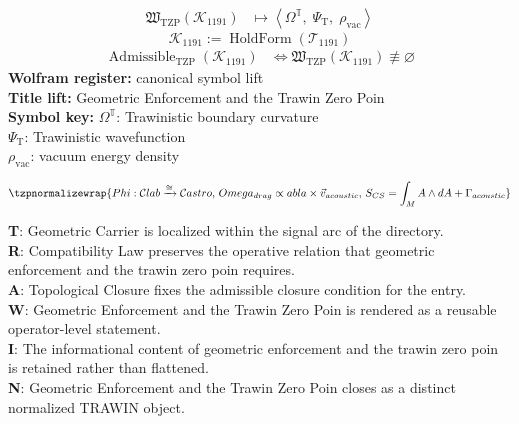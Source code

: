 \noindent
\begin{minipage}[t]{0.48\linewidth}
\begingroup
\small
\[
\begin{aligned}
\mathfrak{W}_{\mathrm{TZP}}\!\left(\mathcal{K}_{1191}\right)
&\longmapsto
\left\langle \Omega^{\mathbb{T}},\; \Psi_{\mathrm{T}},\; \rho_{\mathrm{vac}} \right\rangle
\end{aligned}
\]
\[
\mathcal{K}_{1191}
:=
\operatorname{HoldForm}\!\left(\mathcal{T}_{1191}\right)
\]
\[
\begin{aligned}
\operatorname{Admissible}_{\mathrm{TZP}}\!\left(\mathcal{K}_{1191}\right)
&\Longleftrightarrow
\mathfrak{W}_{\mathrm{TZP}}\!\left(\mathcal{K}_{1191}\right)\not\equiv\varnothing
\end{aligned}
\]
\textbf{Wolfram register:} canonical symbol lift\\
\textbf{Title lift:} Geometric Enforcement and the Trawin Zero Poin\\
\textbf{Symbol key:} \(\Omega^{\mathbb{T}}\): Trawinistic boundary curvature\\ \(\Psi_{\mathrm{T}}\): Trawinistic wavefunction\\ \(\rho_{\mathrm{vac}}\): vacuum energy density
\par
\endgroup
\end{minipage}\hfill
\begin{minipage}[t]{0.48\linewidth}
\[
\tzpnormalizewrap{Phi: \mathcal{C} {lab} \xrightarrow{\cong} \mathcal{C} {astro},\,Omega_{drag} \propto  abla \times \vec{v}_{acoustic},\,S_{CS} = \int_{M} A \wedge dA + \Gamma_{acoustic}}
\]

\small
\textbf{T}: Geometric Carrier is localized within the signal arc of the directory.\\
\textbf{R}: Compatibility Law preserves the operative relation that geometric enforcement and the trawin zero poin requires.\\
\textbf{A}: Topological Closure fixes the admissible closure condition for the entry.\\
\textbf{W}: Geometric Enforcement and the Trawin Zero Poin is rendered as a reusable operator-level statement.\\
\textbf{I}: The informational content of geometric enforcement and the trawin zero poin is retained rather than flattened.\\
\textbf{N}: Geometric Enforcement and the Trawin Zero Poin closes as a distinct normalized TRAWIN object.
\normalsize
\end{minipage}

